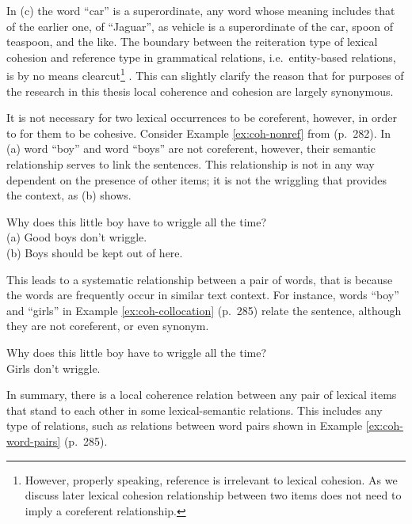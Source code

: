 In (c) the word ``car'' is a superordinate, any word whose meaning includes that of the earlier one, of ``Jaguar'', as vehicle is a superordinate of the car, spoon of teaspoon, and the like. 
The boundary between the reiteration type of lexical cohesion and reference type in grammatical relations, i.e.\ entity-based relations, is by no means clearcut\footnote{However, properly speaking, reference is irrelevant to lexical cohesion. As we discuss later lexical cohesion relationship between two items does not need to imply a coreferent relationship.} \cite{halliday76}. 
This can slightly clarify the reason that for purposes of the research in this thesis local coherence and cohesion are largely synonymous.

It is not necessary for two lexical occurrences to be coreferent, however, in order to for them to be cohesive. 
Consider Example \ref{ex:coh-nonref} from (p.~282). 
In (a) word ``boy'' and  word ``boys'' are not coreferent, however, their semantic relationship serves to link the sentences. 
This relationship is not in any way dependent on the presence of other items; it is not the wriggling that provides the context, as (b) shows. 

\begin{examples}
	\label{ex:coh-nonref}
	Why does this little boy have to wriggle all the time? \\
	(a) Good boys don't wriggle. \\
	(b) Boys should be kept out of here. \\
\end{examples} 

This leads to a systematic relationship between a pair of words, that is because the words are frequently occur in similar text context. 
For instance, words ``boy'' and ``girls'' in Example \ref{ex:coh-collocation} \cite{halliday76}(p.~285) relate the sentence, although they are not coreferent, or even synonym. 

\begin{examples}
	\label{ex:coh-collocation}
	Why does this little boy have to wriggle all the time? \\
	Girls don't wriggle. 
\end{examples}

In summary, there is a local coherence relation between any pair of lexical items that stand to each other in some lexical-semantic relations. 
This includes any type of relations, such as relations between word pairs shown in Example \ref{ex:coh-word-pairs} \cite{halliday76} (p.~285). 

